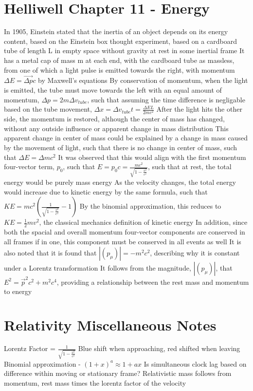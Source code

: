 \documentclass[11 pt, twoside]{article}
\newenvironment{outline*}
{
	\begin{outline}[enumerate]
	}
	{\end{outline}
}
\begin{document}
\section{Helliwell Chapter 11 - Energy}
\begin{outline*}
\1 In 1905, Einstein stated that the inertia of an object depends on its energy content, based on the Einstein box thought experiment, based on a cardboard tube of length L in empty space without gravity at rest in some inertial frame
\2 It has a metal cap of mass m at each end, with the cardboard tube as massless, from one of which a light pulse is emitted towards the right, with momentum $\Delta E = \vec{\Delta p}c$ by Maxwell's equations
\2 By conservation of momentum, when the light is emitted, the tube must move towards the left with an equal amount of momentum, $\Delta p = 2m\Delta v_{tube}$, such that assuming the time difference is negligable based on the tube movement, $\Delta x = \Delta v_{tube}t = \frac{\Delta EL}{2mc^2}$
\3 After the light hits the other side, the momentum is restored, although the center of mass has changed, without any outside influence or apparent change in mass distribution
\1 This apparent change in center of mass could be explained by a change in mass caused by the movement of light, such that there is no change in center of mass, such that $\Delta E = \Delta mc^2$
\2 It was observed that this would align with the first momentum four-vector term, $p_0$, such that $E = p_0c = \frac{mc^2}{\sqrt{1 - \frac{v^2}{c^2}}}$, such that at rest, the total energy would be purely mass energy
\2 As the velocity changes, the total energy would increase due to kinetic energy by the same formula, such that $KE = mc^2(\frac{1}{\sqrt{1 - \frac{v^2}{c^2}}} - 1)$
\3 By the binomial approximation, this reduces to $KE = \frac{1}{2}mv^2$, the classical mechanics definition of kinetic energy
\2 In addition, since both the spacial and overall momentum four-vector components are conserved in all frames if in one, this component must be conserved in all events as well
\2 It is also noted that it is found that $|(p_{\mu})| = -m^2c^2$, describing why it is constant under a Lorentz transformation
\3 It follows from the magnitude, $|(p_{\mu})|$, that $E^2 = \vec{p}^2c^2 + m^2c^4$, providing a relationship between the rest mass and momentum to energy
\end{outline*}
\section{Relativity Miscellaneous Notes}
Lorentz Factor = $\frac{1}{\sqrt{1 - \frac{v^2}{c^2}}}$
Blue shift when approaching, red shifted when leaving
Binomial approximation - $(1 + x)^a \approx 1 + ax$
Is simultaneous clock lag based on difference within moving or stationary frame?
Relativistic mass follows from momentum, rest mass times the lorentz factor of the velocity
\end{document}
